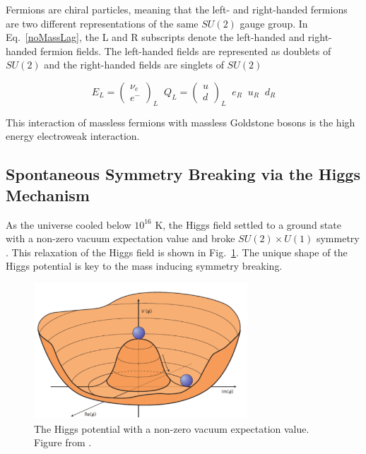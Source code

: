 Fermions are chiral particles, meaning that the left- and right-handed fermions are two different representations of the same $SU(2)$ gauge group. In Eq.~\ref{noMassLag}, the L and R subscripts denote the left-handed and right-handed fermion fields. The left-handed fields are represented as doublets of $SU(2)$ and the right-handed fields are singlets of $SU(2)$ \cite{Peskin}

\begin{equation}
    E_{L} = \begin{pmatrix}
            \nu_{e}\\
            e^{-}
            \end{pmatrix}_{L}
    \; \;
    Q_{L} = \begin{pmatrix}
            u \\
            d
            \end{pmatrix}_{L}
    \; \;
    e_{R}
    \; \;
    u_{R}
    \; \;
    d_{R}
\end{equation}

This interaction of massless fermions with massless Goldstone bosons is the high energy electroweak interaction.

\subsection{Spontaneous Symmetry Breaking via the Higgs Mechanism}

As the universe cooled below $10^{16}$ K, the Higgs field settled to a ground state with a non-zero vacuum expectation value and broke $SU(2) \times U(1)$ symmetry \cite{Blundell}. This relaxation of the Higgs field is shown in Fig.~\ref{fig:HiggsPotential}. The unique shape of the Higgs potential is key to the mass inducing symmetry breaking.

\begin{figure}[htb]
    \centering
    \includegraphics[width=8cm]{HiggsPotential.png}
    \caption{The Higgs potential with a non-zero vacuum expectation value. Figure from \cite{ellisHiggs}. }
    \label{fig:HiggsPotential}
\end{figure}

